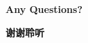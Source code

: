 
\begin{frame}{}
    \centering
    \begin{LARGE}
    \textbf{\textcolor{SJTUPrimary}{Any Questions?}}
    \end{LARGE}
\end{frame}

\begin{frame}{}
    \centering
    \begin{LARGE}
    \textbf{\textcolor{SJTUPrimary}{谢谢聆听}}
    \end{LARGE}
\end{frame}
